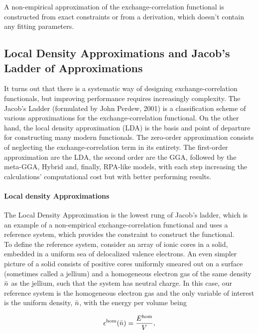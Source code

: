 \documentclass{homework}
\begin{document}
A non-empirical approximation of the exchange-correlation functional is constructed from exact constraints or from a derivation, which doesn't contain any fitting parameters. \\

\subsection{Local Density Approximations and Jacob's Ladder of Approximations}

It turns out that there is a systematic way of designing exchange-correlation functionals, but improving performance requires increasingly complexity. The Jacob's Ladder (formulated by John Perdew, 2001) is a classification scheme of various approximations for the exchange-correlation functional. On the other hand, the local density approximation (LDA) is the basis and point of departure for constructing many modern functionals. The zero-order approximation consists of neglecting the exchange-correlation term in its entirety. The first-order approximation are the LDA, the second order are the GGA, followed by the meta-GGA, Hybrid and, finally, RPA-like models, with each step increasing the calculations' computational cost but with better performing results. \\

\paragraph{\textbf{Local density Approximations}}

The Local Density Approximation is the lowest rung of Jacob's ladder, which is an example of a non-empirical exchange-correlation functional and uses a reference system, which provides the constraint to construct the functional. \\

To define the reference system, consider an array of ionic cores in a solid, embedded in a uniform sea of delocalized valence electrons. An even simpler picture of a solid consists of positive cores uniformly smeared out on a surface (sometimes called a jellium) and a homogeneous electron gas of the same density $\Bar{n}$ as the jellium, such that the system has neutral charge. In this case, our reference system is the homogeneous electron gas and the only variable of interest is the uniform density, $\Bar{n}$, with the energy per volume being

$$
\epsilon^{\textnormal{hom}}(\Bar{n}) = \frac{E^{\textnormal{hom}}}{V},
$$
\end{document}
